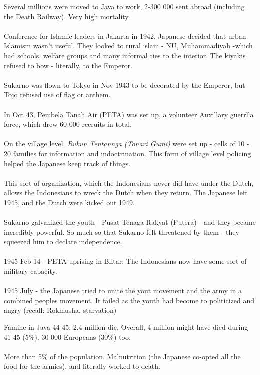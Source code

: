 \documentclass[a4paper]{article}
\begin{document}
\noindent Several millions were moved to Java to work, 2-300 000 sent abroad (including the Death Railway). Very high mortality.\\
\\
Conference for Islamic leaders in Jakarta in 1942. Japanese decided that urban Islamism wasn't useful. They looked to rural islam - NU, Muhammadiyah -which had schools, welfare groups and many informal ties to the interior. The kiyakis refused to bow - literally, to the Emperor.\\
\\
Sukarno was flown to Tokyo in Nov 1943 to be decorated by the Emperor, but Tojo refused use of flag or anthem.\\
\\
In Oct 43, Pembela Tanah Air (PETA) was set up, a volunteer Auxillary guerrlla force, which drew 60 000 recruits in total.\\
\\
On the village level, \textit{Rukun Tentannga (Tonari Gumi)} were set up - cells of 10 - 20 families for information and indoctrination. This form of village level policing helped the Japanese keep track of things.\\
\\
This sort of organization, which the Indonesians never did have under the Dutch, allows the Indonesians to wreck the Dutch when they return. The Japanese left 1945, and the Dutch were kicked out 1949.\\
\\
Sukarno galvanized the youth - Pusat Tenaga Rakyat (Putera) - and they became incredibly powerful. So much so that Sukarno felt threatened by them - they squeezed him to declare independence.\\
\\
1945 Feb 14 - PETA uprising in Blitar: The Indonesians now have some sort of military capacity.\\
\\
1945 July - the Japanese tried to unite the yout movement and the army in a combined peoples movement. It failed as the youth had become to politicized and angry (recall: Rokmusha, starvation)
\begin{framed}
	\begin{displayquote}
		Famine in Java 44-45: 2.4 million die. Overall, 4 million might have died during 41-45 (5\%). 30 000 Europeans (30\%) too.\\
		\\
		More than 5\% of the population. Malnutrition (the Japanese co-opted all the food for the armies), and literally worked to death.
	\end{displayquote}
\end{framed}
\end{document}
